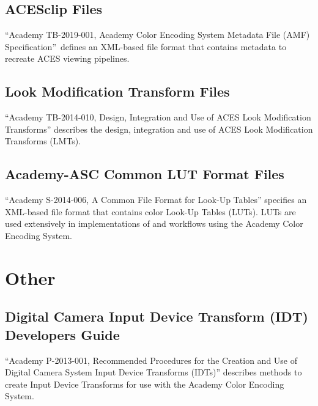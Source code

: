\subsection{ACESclip Files}
``Academy TB-2019-001, Academy Color Encoding System Metadata File (AMF) Specification'' defines an XML-based file format that contains metadata to recreate ACES viewing pipelines.

\subsection{Look Modification Transform Files}
``Academy TB-2014-010, Design, Integration and Use of ACES Look Modification Transforms'' describes the design, integration and use of ACES Look Modification Transforms (LMTs).

\subsection{Academy-ASC Common LUT Format Files}
``Academy S-2014-006, A Common File Format for Look-Up Tables'' specifies an XML-based file format that contains color Look-Up Tables (LUTs). LUTs are used extensively in implementations of and workflows using the Academy Color Encoding System.


\section{Other}
\subsection{Digital Camera Input Device Transform (IDT) Developers Guide}
``Academy P-2013-001, Recommended Procedures for the Creation and Use of Digital Camera System Input Device Transforms (IDTs)'' describes methods to create Input Device Transforms for use with the Academy Color Encoding System.